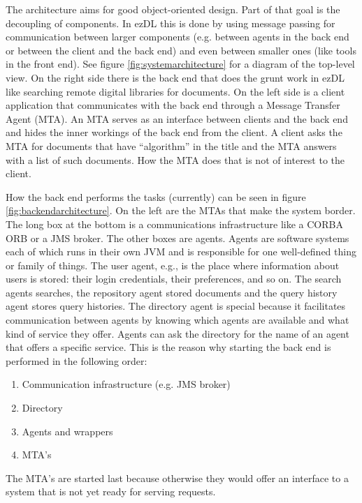 \documentclass[12pt]{book}
\begin{document}
The architecture aims for good object-oriented design. Part of that goal is the decoupling of components. In ezDL this is done by using message passing for communication between larger components (e.g. between agents in the back end or between the client and the back end) and even between smaller ones (like tools in the front end). See figure \ref{fig:systemarchitecture} for a diagram of the top-level view. On the right side there is the back end that does the grunt work in ezDL like searching remote digital libraries for documents. On the left side is a client application that communicates with the back end through a Message Transfer Agent (MTA). An MTA serves as an interface between clients and the back end and hides the inner workings of the back end from the client. A client asks the MTA for documents that have ``algorithm'' in the title and the MTA answers with a list of such documents. How the MTA does that is not of interest to the client. 

How the back end performs the tasks (currently) can be seen in figure \ref{fig:backendarchitecture}. On the left are the MTAs that make the system border. The long box at the bottom is a communications infrastructure like a CORBA ORB or a JMS broker. The other boxes are agents. Agents are software systems each of which runs in their own JVM and is responsible for one well-defined thing or family of things. The user agent, e.g., is the place where information about users is stored: their login credentials, their preferences, and so on. The search agents searches, the repository agent stored documents and the query history agent stores query histories. The directory agent is special because it facilitates communication between agents by knowing which agents are available and what kind of service they offer. Agents can ask the directory for the name of an agent that offers a specific service. This is the reason why starting the back end is performed in the following order:

\begin{enumerate}
\item Communication infrastructure (e.g. JMS broker)
\item Directory
\item Agents and wrappers
\item MTA's
\end{enumerate}

The MTA's are started last because otherwise they would offer an interface to a system that is not yet ready for serving requests.
\end{document}
